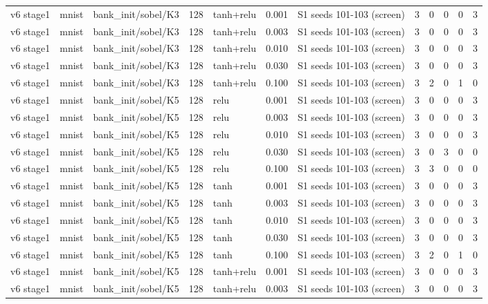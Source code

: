 \begin{table}[htbp]
{\begin{tabular}{@{}lllrlrlrrrrr@{}}
v6 stage1 & mnist & bank\_init/sobel/K3 & 128 & tanh+relu & 0.001 & S1 seeds 101-103 (screen) & 3 & 0 & 0 & 0 & 3 \\
v6 stage1 & mnist & bank\_init/sobel/K3 & 128 & tanh+relu & 0.003 & S1 seeds 101-103 (screen) & 3 & 0 & 0 & 0 & 3 \\
v6 stage1 & mnist & bank\_init/sobel/K3 & 128 & tanh+relu & 0.010 & S1 seeds 101-103 (screen) & 3 & 0 & 0 & 0 & 3 \\
v6 stage1 & mnist & bank\_init/sobel/K3 & 128 & tanh+relu & 0.030 & S1 seeds 101-103 (screen) & 3 & 0 & 0 & 0 & 3 \\
v6 stage1 & mnist & bank\_init/sobel/K3 & 128 & tanh+relu & 0.100 & S1 seeds 101-103 (screen) & 3 & 2 & 0 & 1 & 0 \\
v6 stage1 & mnist & bank\_init/sobel/K5 & 128 & relu & 0.001 & S1 seeds 101-103 (screen) & 3 & 0 & 0 & 0 & 3 \\
v6 stage1 & mnist & bank\_init/sobel/K5 & 128 & relu & 0.003 & S1 seeds 101-103 (screen) & 3 & 0 & 0 & 0 & 3 \\
v6 stage1 & mnist & bank\_init/sobel/K5 & 128 & relu & 0.010 & S1 seeds 101-103 (screen) & 3 & 0 & 0 & 0 & 3 \\
v6 stage1 & mnist & bank\_init/sobel/K5 & 128 & relu & 0.030 & S1 seeds 101-103 (screen) & 3 & 0 & 3 & 0 & 0 \\
v6 stage1 & mnist & bank\_init/sobel/K5 & 128 & relu & 0.100 & S1 seeds 101-103 (screen) & 3 & 3 & 0 & 0 & 0 \\
v6 stage1 & mnist & bank\_init/sobel/K5 & 128 & tanh & 0.001 & S1 seeds 101-103 (screen) & 3 & 0 & 0 & 0 & 3 \\
v6 stage1 & mnist & bank\_init/sobel/K5 & 128 & tanh & 0.003 & S1 seeds 101-103 (screen) & 3 & 0 & 0 & 0 & 3 \\
v6 stage1 & mnist & bank\_init/sobel/K5 & 128 & tanh & 0.010 & S1 seeds 101-103 (screen) & 3 & 0 & 0 & 0 & 3 \\
v6 stage1 & mnist & bank\_init/sobel/K5 & 128 & tanh & 0.030 & S1 seeds 101-103 (screen) & 3 & 0 & 0 & 0 & 3 \\
v6 stage1 & mnist & bank\_init/sobel/K5 & 128 & tanh & 0.100 & S1 seeds 101-103 (screen) & 3 & 2 & 0 & 1 & 0 \\
v6 stage1 & mnist & bank\_init/sobel/K5 & 128 & tanh+relu & 0.001 & S1 seeds 101-103 (screen) & 3 & 0 & 0 & 0 & 3 \\
v6 stage1 & mnist & bank\_init/sobel/K5 & 128 & tanh+relu & 0.003 & S1 seeds 101-103 (screen) & 3 & 0 & 0 & 0 & 3 \\

\end{tabular}}
\end{table}
